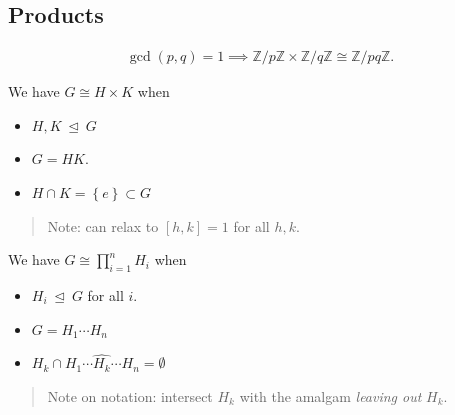 \hypertarget{products}{%
\subsection{Products}\label{products}}

\begin{theorem}

\begin{align*}
\gcd(p, q) = 1 \implies {\mathbb{Z}}/p{\mathbb{Z}}\times{\mathbb{Z}}/q{\mathbb{Z}}\cong {\mathbb{Z}}/pq{\mathbb{Z}}
.\end{align*}

\end{theorem}

\begin{theorem}

We have \(G \cong H \times K\) when

\begin{itemize}
\item
  \(H, K {~\trianglelefteq~}G\)
\item
  \(G = HK\).
\item
  \(H\cap K = \left\{{e}\right\} \subset G\)
\end{itemize}

\begin{quote}
Note: can relax to \([h,k] = 1\) for all \(h, k\).
\end{quote}

\end{theorem}

\begin{theorem}

We have \(G \cong \prod_{i=1}^n H_i\) when

\begin{itemize}
\item
  \(H_i {~\trianglelefteq~}G\) for all \(i\).
\item
  \(G = H_1 \cdots H_n\)
\item
  \(H_k \cap H_1 \cdots \widehat{H_k} \cdots H_n = \emptyset\)
\end{itemize}

\begin{quote}
Note on notation: intersect \(H_k\) with the amalgam \emph{leaving out}
\(H_k\).
\end{quote}

\end{theorem}

